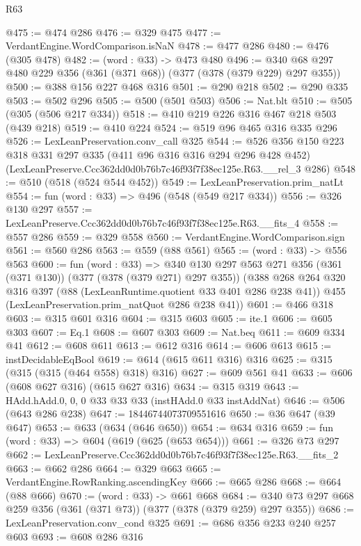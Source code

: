 \begin{lexlean}{R63}
\begin{coremodule}
@475 := @474 @286
@476 := @329 @475
@477 := VerdantEngine.WordComparison.isNaN
@478 := @477 @286
@480 := @476 (@305 @478)
@482 := (word : @33) -> @473 @480
@496 := @340 @68 @297 @480 @229 @356 (@361 (@371 @68)) (@377 (@378 (@379 @229) @297 @355))
@500 := @388 @156 @227 @468 @316
@501 := @290 @218
@502 := @290 @335
@503 := @502 @296
@505 := @500 (@501 @503)
@506 := Nat.blt
@510 := @505 (@305 (@506 @217 @334))
@518 := @410 @219 @226 @316 @467 @218 @503 (@439 @218)
@519 := @410 @224
@524 := @519 @96 @465 @316 @335 @296
@526 := LexLeanPreservation.conv_call @325
@544 := @526
    @356
    @150
    @223
    @318
    @331
    @297
    @335
    (@411 @96 @316 @316 @294 @296 @428 @452)
    (LexLeanPreserve.Ccc362dd0d0b76b7c46f93f7f38ec125e.R63.__rel_3 @286)
@548 := @510 (@518 (@524 @544 @452))
@549 := LexLeanPreservation.prim_natLt
@554 := fun (word : @33) => @496 (@548 (@549 @217 @334))
@556 := @326 @130 @297
@557 := LexLeanPreserve.Ccc362dd0d0b76b7c46f93f7f38ec125e.R63.__fits_4
@558 := @557 @286
@559 := @329 @558
@560 := VerdantEngine.WordComparison.sign
@561 := @560 @286
@563 := @559 (@88 @561)
@565 := (word : @33) -> @556 @563
@600 := fun (word : @33) =>
  @340
    @130
    @297
    @563
    @271
    @356
    (@361 (@371 @130))
    (@377 (@378 (@379 @271) @297 @355))
    (@388
      @268
      @264
      @320
      @316
      @397
      (@88 (LexLeanRuntime.quotient @33 @401 @286 @238 @41))
      @455
      (LexLeanPreservation.prim_natQuot @286 @238 @41))
@601 := @466 @318
@603 := @315 @601 @316
@604 := @315 @603
@605 := ite.{1}
@606 := @605 @303
@607 := Eq.{1}
@608 := @607 @303
@609 := Nat.beq
@611 := @609 @334 @41
@612 := @608 @611
@613 := @612 @316
@614 := @606 @613
@615 := instDecidableEqBool
@619 := @614 (@615 @611 @316) @316
@625 := @315 (@315 (@315 (@464 @558) @318) @316)
@627 := @609 @561 @41
@633 := @606 (@608 @627 @316) (@615 @627 @316)
@634 := @315 @319
@643 := HAdd.hAdd.{0, 0, 0} @33 @33 @33 (instHAdd.{0} @33 instAddNat)
@646 := @506 (@643 @286 @238)
@647 := 18446744073709551616
@650 := @36 @647 (@39 @647)
@653 := @633 (@634 (@646 @650))
@654 := @634 @316
@659 := fun (word : @33) => @604 (@619 (@625 (@653 @654)))
@661 := @326 @73 @297
@662 := LexLeanPreserve.Ccc362dd0d0b76b7c46f93f7f38ec125e.R63.__fits_2
@663 := @662 @286
@664 := @329 @663
@665 := VerdantEngine.RowRanking.ascendingKey
@666 := @665 @286
@668 := @664 (@88 @666)
@670 := (word : @33) -> @661 @668
@684 := @340 @73 @297 @668 @259 @356 (@361 (@371 @73)) (@377 (@378 (@379 @259) @297 @355))
@686 := LexLeanPreservation.conv_cond @325
@691 := @686 @356 @233 @240 @257 @603
@693 := @608 @286 @316

\end{coremodule}
\end{lexlean}
